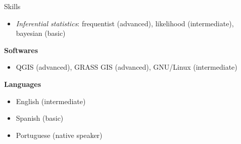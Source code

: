 \documentclass{resume}
\begin{document}
\begin{rSection}{Skills}
\begin{itemize}
\item {\it Inferential statistics}: frequentist (advanced), likelihood (intermediate), bayesian (basic)
\end{itemize}

{\bf Softwares}
\begin{itemize}
\item QGIS (advanced), GRASS GIS (advanced), GNU/Linux (intermediate)
\end{itemize}

{\bf Languages}
\begin{itemize}
\item English (intermediate)
\item Spanish (basic)
\item Portuguese (native speaker)
\end{itemize}

\end{rSection}

\end{document}
